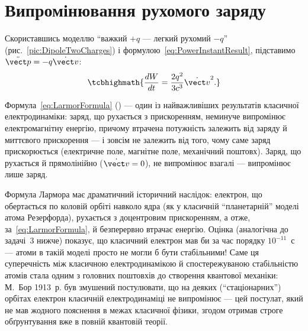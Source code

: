 \section{Випромінювання рухомого заряду}

Скориставшись моделлю \enquote{важкий $+q$ --- легкий рухомий $-q$} (рис.~\ref{pic:DipoleTwoCharges}) і формулою~\eqref{eq:PowerInstantResult},
підставимо $\ddot{\vect p} = -q\dot{\vect v}$:
\begin{equation}\label{eq:LarmorFormula}
	\tcbhighmath{
		\frac{dW}{dt} = \frac{2q^2}{3c^3}\dot{\vect v}^2.
	}
\end{equation}

\begin{Attention}
	Формула~\eqref{eq:LarmorFormula} () --- один із найважливіших результатів класичної електродинаміки: 
	заряд, що рухається з прискоренням, неминуче випромінює електромагнітну енергію, причому втрачена потужність залежить  від
	заряду й миттєвого прискорення --- і зовсім не залежить від того, чому саме заряд прискорюється (електричне поле, магнітне поле, механічний
	поштовх). Заряд, що рухається  й прямолінійно ($\dot{\vect v}=0$), не випромінює взагалі --- випромінює лише
	 заряд.
\end{Attention}

\begin{Attention}
	Формула Лармора має драматичний історичний наслідок: електрон, що обертається по коловій орбіті навколо ядра (як у класичній
	\enquote{планетарній} моделі атома Резерфорда), рухається з доцентровим прискоренням, а отже, за~\eqref{eq:LarmorFormula},  й безперервно втрачає енергію. Оцінка (аналогічна до задачі~3 нижче) показує, що класичний електрон мав би 
	за час порядку $10^{-11}$~с --- атоми в такій моделі просто не могли б бути стабільними! Саме ця суперечність між класичною електродинамікою
	й спостережуваною стабільністю атомів стала одним з головних поштовхів до створення квантової механіки: М.~Бор 1913~р. був змушений
	постулювати, що на деяких (\enquote{стаціонарних}) орбітах електрон  класичній електродинаміці не випромінює --- цей
	постулат, який не мав жодного пояснення в межах класичної фізики, згодом отримав строге обґрунтування вже в повній квантовій теорії.
\end{Attention}

